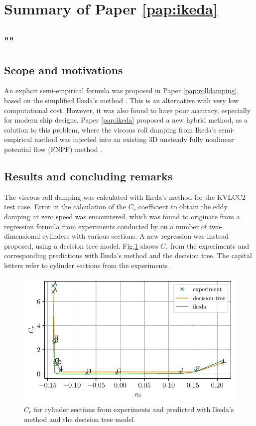 \section{Summary of Paper \ref{pap:ikeda}}
\subsection*{""}
\subsection*{Scope and motivations}
An explicit semi-empirical formula was proposed in Paper \ref{pap:rolldamping}, based on the simplified Ikeda's method \cite{kawaharaSimplePredictionFormula2011}. This is an alternative with very low computational cost. However, it was also found to have poor accuracy, especially for modern ship designs. 
Paper \ref{pap:ikeda} proposed a new hybrid method, as a solution to this problem, where the viscous roll damping from Ikeda’s semi-empirical method was injected into an existing 3D unsteady fully nonlinear potential flow (FNPF) method \cite{kjellbergFullyNonlinearUnsteady2013}.

\subsection*{Results and concluding remarks}
The viscous roll damping was calculated with Ikeda's method \cite{ikedaComponentsRollDamping1978} for the KVLCC2 test case. Error in the calculation of the $C_r$ coefficient to obtain the eddy damping at zero speed was encountered, which was found to originate from a regression formula from experiments conducted by \textcite{ikedaEddyMakingComponent1978} on a number of two-dimensional cylinders with various sections. A new regression was instead proposed, using a decision tree model.
Fig.\ref{fig:ikeda_sections} shows $C_r$ from the experiments and corresponding predictions with Ikeda's method and the decision tree. The capital letters refer to cylinder sections from the experiments
\cite{ikedaEddyMakingComponent1978}.
\begin{figure}[h]
\center
\includegraphics[width=\textwidth]{figures/ikeda_sections.pdf}
\vspace{-0.4cm}
\caption{$C_r$ for cylinder sections from experiments and predicted with Ikeda's method and the decision tree model.}
\label{fig:ikeda_sections}
\end{figure}
\FloatBarrier

